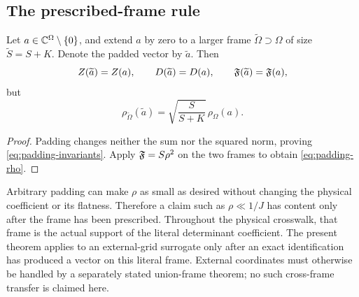 \subsection{The prescribed-frame rule}

\begin{proposition}
\label{prop:zero-padding}
Let \(a\in\mathbb C^\Omega\setminus\{0\}\), and extend \(a\) by zero to a
larger frame \(\widetilde\Omega\supset\Omega\) of size
\(\widetilde S=S+K\).  Denote the padded vector by
\(\widetilde a\).  Then
\begin{equation}
 Z(\widetilde a)=Z(a),\qquad
 D(\widetilde a)=D(a),\qquad
 \mathfrak F(\widetilde a)=\mathfrak F(a),
\label{eq:padding-invariants}
\end{equation}
but
\begin{equation}
 \boxed{
 \rho_{\widetilde\Omega}(\widetilde a)
 =\sqrt{\frac{S}{S+K}}\,
 \rho_\Omega(a).}
\label{eq:padding-rho}
\end{equation}
\end{proposition}

\begin{proof}
Padding changes neither the sum nor the squared norm, proving
\eqref{eq:padding-invariants}.  Apply
\(\mathfrak F=S\rho^2\) on the two frames to obtain
\eqref{eq:padding-rho}.
\end{proof}

\begin{remark}
\label{rem:actual-support-mandatory}
Arbitrary padding can make \(\rho\) as small as desired without
changing the physical coefficient or its flatness.  Therefore a
claim such as \(\rho\ll1/J\) has content only after the frame has
been prescribed.  Throughout the physical crosswalk, that frame is
the actual support of the literal determinant coefficient.  The
present theorem applies to an external-grid surrogate only after an
exact identification has produced a vector on this literal frame.
External coordinates must otherwise be handled by a separately
stated union-frame theorem; no such cross-frame transfer is claimed
here.
\end{remark}
